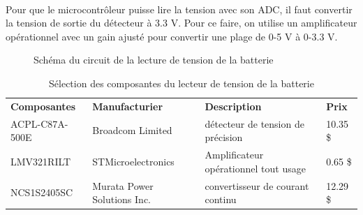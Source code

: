 	\paragraph*{}	
	Pour que le microcontrôleur puisse lire la tension avec son ADC, il faut convertir la tension de sortie du détecteur à 3.3 V. Pour ce faire, on utilise un amplificateur opérationnel avec un gain ajusté pour convertir une plage de 0-5 V à 0-3.3 V.
	
	\begin{figure}
		\centering
		\caption{Schéma du circuit de la lecture de tension de la batterie}
		\label{fig:schemalecturetension}
	\end{figure}
	
	\begin{table}[H]
		\centering
		\caption{Sélection des composantes du lecteur de tension de la batterie}
		\label{SelectionSenseVoltageBat}
		\begin{tabular}{|p{3cm}|p{3.5cm}|p{6cm}|p{1.5cm}|}
			\hline
			\textbf{Composantes} & \textbf{Manufacturier} & \textbf{Description} & \textbf{Prix}
			\\ \hhline{|=|=|=|=|}
			ACPL-C87A-500E & Broadcom Limited & détecteur de tension de précision & 10.35 \$	\\ \hline
			LMV321RILT & STMicroelectronics & Amplificateur opérationnel tout usage & 0.65 \$	\\ \hline
			NCS1S2405SC & Murata Power Solutions Inc. & convertisseur de courant continu & 12.29 \$	\\ \hline
		\end{tabular}
	\end{table} 